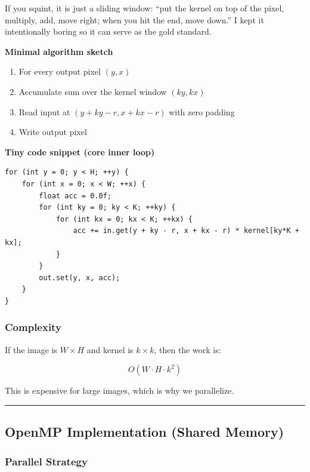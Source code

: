\documentclass[
]{article}
\providecommand{\tightlist}{%
  \setlength{\itemsep}{0pt}\setlength{\parskip}{0pt}}
\begin{document}
If you squint, it is just a sliding window: ``put the kernel on top of
the pixel, multiply, add, move right; when you hit the end, move down.''
I kept it intentionally boring so it can serve as the gold standard.

\textbf{Minimal algorithm sketch}

\begin{enumerate}
\def\labelenumi{\arabic{enumi}.}
\tightlist
\item
  For every output pixel \((y, x)\)
\item
  Accumulate sum over the kernel window \((ky, kx)\)
\item
  Read input at \((y+ky-r, x+kx-r)\) with zero padding
\item
  Write output pixel
\end{enumerate}

\textbf{Tiny code snippet (core inner loop)}

\begin{verbatim}
for (int y = 0; y < H; ++y) {
    for (int x = 0; x < W; ++x) {
        float acc = 0.0f;
        for (int ky = 0; ky < K; ++ky) {
            for (int kx = 0; kx < K; ++kx) {
                acc += in.get(y + ky - r, x + kx - r) * kernel[ky*K + kx];
            }
        }
        out.set(y, x, acc);
    }
}
\end{verbatim}

\subsubsection{Complexity}\label{complexity}

If the image is \(W \times H\) and kernel is \(k \times k\), then the
work is:

\[O(W \cdot H \cdot k^2)\]

This is expensive for large images, which is why we parallelize.

\begin{center}\rule{0.5\linewidth}{0.5pt}\end{center}

\subsection{OpenMP Implementation (Shared
Memory)}\label{openmp-implementation-shared-memory}

\subsubsection{Parallel Strategy}\label{parallel-strategy}
\end{document}

